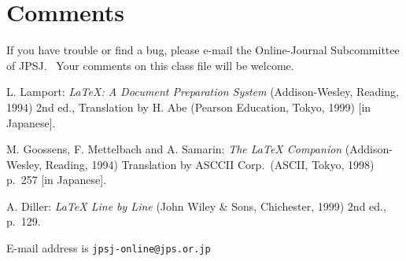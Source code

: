 \documentclass{jpsj2}
\begin{document}
\section{Comments}

If you have trouble or find a bug, please e-mail the Online-Journal Subcommittee of JPSJ\@.~\cite{jps}  Your comments on this class file will be welcome.

\begin{thebibliography}{9}

 L. Lamport: \textit{\LaTeX: A Document Preparation System} (Addison-Wesley, Reading, 1994) 2nd ed., Translation by H. Abe (Pearson Education, Tokyo, 1999) [in Japanese].

 M. Goossens, F. Mettelbach and A. Samarin: \textit{The \LaTeX{} Companion} (Addison-Wesley, Reading, 1994) Translation by ASCCII Corp.\ (ASCII, Tokyo, 1998) p.~257 [in Japanese].

 A. Diller: \textit{\LaTeX{} Line by Line} (John Wiley \& Sons, Chichester, 1999) 2nd ed., p.~129.

 E-mail address is \texttt{jpsj-online@jps.or.jp}

\end{thebibliography}
\end{document}
